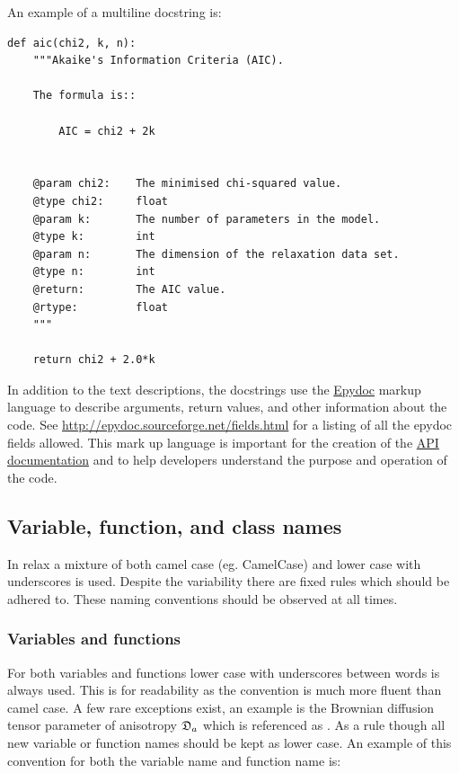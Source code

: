 An example of a multiline docstring is:

\begin{lstlisting}
def aic(chi2, k, n):
    """Akaike's Information Criteria (AIC).

    The formula is::

        AIC = chi2 + 2k


    @param chi2:    The minimised chi-squared value.
    @type chi2:     float
    @param k:       The number of parameters in the model.
    @type k:        int
    @param n:       The dimension of the relaxation data set.
    @type n:        int
    @return:        The AIC value.
    @rtype:         float
    """

    return chi2 + 2.0*k
\end{lstlisting}

In addition to the text descriptions, the docstrings use the \href{http://epydoc.sourceforge.net/}{Epydoc} markup language to describe arguments, return values, and other information about the code.  See \href{http://epydoc.sourceforge.net/fields.html}{http://epydoc.sourceforge.net/fields.html} for a listing of all the epydoc fields allowed.  This mark up language is important for the creation of the \href{http://www.nmr-relax.com/api/}{API documentation} and to help developers understand the purpose and operation of the code.


\subsection{Variable, function, and class names}

In relax a mixture of both camel case (eg. CamelCase) and lower case with underscores is used.  Despite the variability there are fixed rules which should be adhered to.  These naming conventions should be observed at all times.



\subsubsection{Variables and functions}

For both variables and functions lower case with underscores between words is always used.  This is for readability as the convention is much more fluent than camel case.  A few rare exceptions exist, an example is the Brownian diffusion tensor parameter of anisotropy $\mathfrak{D}_a$ which is referenced as .  As a rule though all new variable or function names should be kept as lower case.  An example of this convention for both the variable name and function name is:

